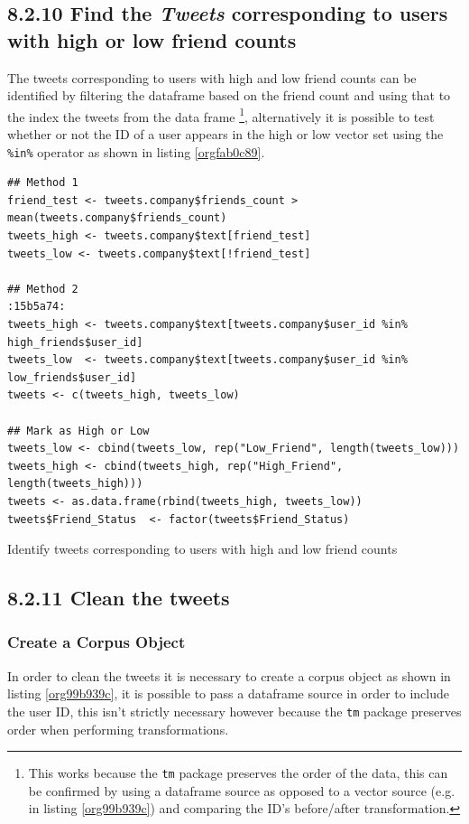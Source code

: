 \documentclass[11pt]{article}
\begin{document}
\subsection{8.2.10 Find the \emph{Tweets} corresponding to users with high or low friend counts}
\label{sec:orgaf31b9a}
The tweets corresponding to users with high and low friend counts can be
identified by filtering the dataframe based on the friend count and using that
to the index the tweets from the data frame \footnote{This works because the \texttt{tm} package preserves the order of the data, this can be confirmed by using a dataframe source as opposed to a vector source (e.g. in listing \ref{org99b939c}) and comparing the ID's before/after transformation.}, alternatively it is possible
to test whether or not the ID of a user appears in the high or low vector
set using the \texttt{\%in\%} operator as shown in listing \ref{orgfab0c89}.

\begin{listing}[htbp]
\begin{verbatim}
## Method 1
friend_test <- tweets.company$friends_count > mean(tweets.company$friends_count)
tweets_high <- tweets.company$text[friend_test]
tweets_low <- tweets.company$text[!friend_test]

## Method 2                                                                 :15b5a74:
tweets_high <- tweets.company$text[tweets.company$user_id %in%  high_friends$user_id]
tweets_low  <- tweets.company$text[tweets.company$user_id %in%  low_friends$user_id]
tweets <- c(tweets_high, tweets_low)

## Mark as High or Low
tweets_low <- cbind(tweets_low, rep("Low_Friend", length(tweets_low)))
tweets_high <- cbind(tweets_high, rep("High_Friend", length(tweets_high)))
tweets <- as.data.frame(rbind(tweets_high, tweets_low))
tweets$Friend_Status  <- factor(tweets$Friend_Status)
\end{verbatim}
\caption{\label{orgfab0c89}Identify tweets corresponding to users with high and low friend counts}
\end{listing}

\subsection{8.2.11 Clean the tweets}
\label{sec:orga0915c4}
\subsubsection{Create a Corpus Object}
\label{sec:orga383ea9}
In order to clean the tweets it is necessary to create a corpus object as shown in listing \ref{org99b939c}, it is possible to pass a dataframe source in order to include the user ID, this isn't strictly necessary however because the \texttt{tm} package preserves order when performing transformations.
\end{document}
